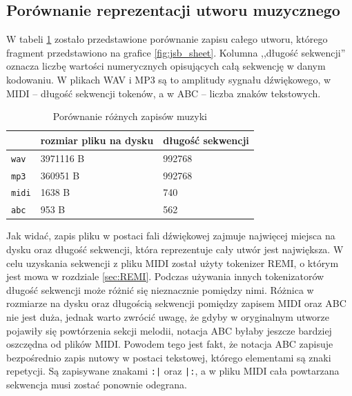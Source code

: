 \documentclass[data-science]{agh-wi} %
\begin{document}
\subsection{Porównanie reprezentacji utworu muzycznego}
W tabeli \ref*{tab:music_diff} zostało przedstawione porównanie zapisu całego utworu, którego fragment przedstawiono na grafice \ref*{fig:jsb_sheet}. Kolumna ,,długość sekwencji'' oznacza liczbę wartości numerycznych opisujących całą sekwencję w danym kodowaniu. W plikach WAV i MP3 są to amplitudy sygnału dźwiękowego, w MIDI -- długość sekwencji tokenów, a w ABC -- liczba znaków tekstowych.

\begin{table}[ht!]
    \centering
    \begin{tabular}{|l|l|l|}
        \hline
                      & rozmiar pliku na dysku & długość sekwencji \\ \hline
        \texttt{wav}  & 3971116 B              & 992768            \\ \hline
        \texttt{mp3}  & 360951 B               & 992768            \\ \hline
        \texttt{midi} & 1638 B                 & 740               \\ \hline
        \texttt{abc}  & 953 B                  & 562               \\ \hline
    \end{tabular}
    \caption{Porównanie różnych zapisów muzyki}\label{tab:music_diff}
\end{table}

Jak widać, zapis pliku w postaci fali dźwiękowej zajmuje najwięcej miejsca na dysku oraz długość sekwencji, która reprezentuje cały utwór jest największa. W celu uzyskania sekwencji z pliku MIDI został użyty tokenizer REMI, o którym jest mowa w rozdziale \ref*{sec:REMI}. Podczas używania innych tokenizatorów długość sekwencji może różnić się nieznacznie pomiędzy nimi. Różnica w rozmiarze na dysku oraz długością sekwencji pomiędzy zapisem MIDI oraz ABC nie jest duża, jednak warto zwrócić uwagę, że gdyby w oryginalnym utworze pojawiły się powtórzenia sekcji melodii, notacja ABC byłaby jeszcze bardziej oszczędna od plików MIDI. Powodem tego jest fakt, że notacja ABC zapisuje bezpośrednio zapis nutowy w postaci tekstowej, którego elementami są znaki repetycji. Są zapisywane znakami \texttt{:|} oraz \texttt{|:}, a w pliku MIDI cała powtarzana sekwencja musi zostać ponownie odegrana.
\end{document}
